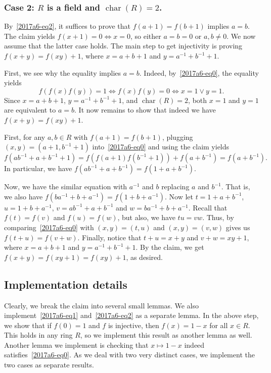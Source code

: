 \documentclass{article}
\DeclareMathOperator{\rchar}{char}
\begin{document}
\subsubsection*{Case 2: $R$ is a field and $\rchar(R) = 2$.}

By~\eqref{2017a6-eq2}, it suffices to prove that $f(a + 1) = f(b + 1)$ implies $a = b$.
The claim yields $f(x + 1) = 0 \iff x = 0$, so either $a = b = 0$ or $a, b \neq 0$.
We now assume that the latter case holds.
The main step to get injectivity is proving $f(x + y) = f(xy) + 1$, where $x = a + b + 1$ and $y = a^{-1} + b^{-1} + 1$.

First, we see why the equality implies $a = b$.
Indeed, by~\eqref{2017a6-eq0}, the equality yields
\[ f(f(x) f(y)) = 1 \iff f(x) f(y) = 0 \iff x = 1 \lor y = 1. \]
Since $x = a + b + 1$, $y = a^{-1} + b^{-1} + 1$, and $\rchar(R) = 2$, both $x = 1$ and $y = 1$ are equivalent to $a = b$.
It now remains to show that indeed we have $f(x + y) = f(xy) + 1$.

First, for any $a, b \in R$ with $f(a + 1) = f(b + 1)$, plugging $(x, y) = (a + 1, b^{-1} + 1)$ into~\eqref{2017a6-eq0} and using the claim yields
\[ f(ab^{-1} + a + b^{-1} + 1) = f(f(a + 1) f(b^{-1} + 1)) + f(a + b^{-1}) = f(a + b^{-1}). \]
In particular, we have $f(ab^{-1} + a + b^{-1}) = f(1 + a + b^{-1})$.

Now, we have the similar equation with $a^{-1}$ and $b$ replacing $a$ and $b^{-1}$.
That is, we also have $f(ba^{-1} + b + a^{-1}) = f(1 + b + a^{-1})$.
Now let $t = 1 + a + b^{-1}$, $u = 1 + b + a^{-1}$, $v = ab^{-1} + a + b^{-1}$ and $w = ba^{-1} + b + a^{-1}$.
Recall that $f(t) = f(v)$ and $f(u) = f(w)$, but also, we have $tu = vw$.
Thus, by comparing~\eqref{2017a6-eq0} with $(x, y) = (t, u)$ and $(x, y) = (v, w)$ gives us $f(t + u) = f(v + w)$.
Finally, notice that $t + u = x + y$ and $v + w = xy + 1$, where $x = a + b + 1$ and $y = a^{-1} + b^{-1} + 1$.
By the claim, we get $f(x + y) = f(xy + 1) = f(xy) + 1$, as desired.



\subsection*{Implementation details}

Clearly, we break the claim into several small lemmas.
We also implement~\eqref{2017a6-eq1} and~\eqref{2017a6-eq2} as a separate lemma.
In the above step, we show that if $f(0) = 1$ and $f$ is injective, then $f(x) = 1 - x$ for all $x \in R$.
This holds in any ring $R$, so we implement this result as another lemma as well.
Another lemma we implement is checking that $x \mapsto 1 - x$ indeed satisfies~\eqref{2017a6-eq0}.
As we deal with two very distinct cases, we implement the two cases as separate results.
\end{document}
